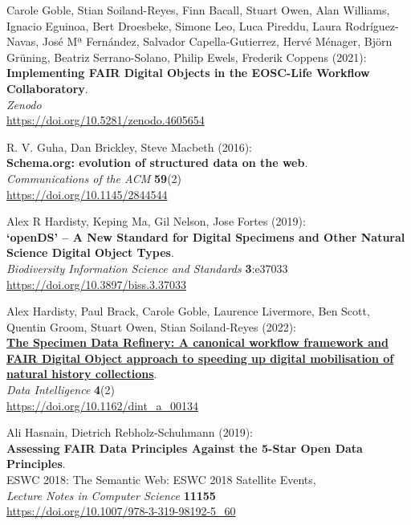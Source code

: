 \begin{thebibliography}{9}
 Carole Goble, Stian Soiland-Reyes, Finn Bacall, Stuart
Owen, Alan Williams, Ignacio Eguinoa, Bert Droesbeke, Simone Leo, Luca
Pireddu, Laura Rodríguez-Navas, José Mª Fernández, Salvador
Capella-Gutierrez, Hervé Ménager, Björn Grüning, Beatriz Serrano-Solano,
Philip Ewels, Frederik Coppens (2021):\\
\textbf{Implementing FAIR Digital Objects in the EOSC-Life Workflow
Collaboratory}.\\
\emph{Zenodo}\\
\url{https://doi.org/10.5281/zenodo.4605654}

 R. V. Guha, Dan Brickley, Steve Macbeth (2016):\\
\textbf{Schema.org: evolution of structured data on the web}.\\
\emph{Communications of the ACM} \textbf{59}(2)\\
\url{https://doi.org/10.1145/2844544}

 Alex R Hardisty, Keping Ma, Gil Nelson, Jose Fortes
(2019):\\
\textbf{`openDS' -- A New Standard for Digital Specimens and Other
Natural Science Digital Object Types}.\\
\emph{Biodiversity Information Science and Standards}
\textbf{3}:e37033\\
\url{https://doi.org/10.3897/biss.3.37033}

 Alex Hardisty, Paul Brack, Carole Goble, Laurence
Livermore, Ben Scott, Quentin Groom, Stuart Owen, Stian Soiland-Reyes
(2022):\\
\href{../specimen-data-refinery/}{\textbf{The Specimen Data Refinery: A
canonical workflow framework and FAIR Digital Object approach to
speeding up digital mobilisation of natural history collections}}.\\
\emph{Data Intelligence} \textbf{4}(2)\\
\url{https://doi.org/10.1162/dint_a_00134}

 Ali Hasnain, Dietrich Rebholz-Schuhmann (2019):\\
\textbf{Assessing FAIR Data Principles Against the 5-Star Open Data
Principles}.\\
ESWC 2018: The Semantic Web: ESWC 2018 Satellite Events,\\
\emph{Lecture Notes in Computer Science} \textbf{11155}\\
\url{https://doi.org/10.1007/978-3-319-98192-5_60}


\end{thebibliography}
